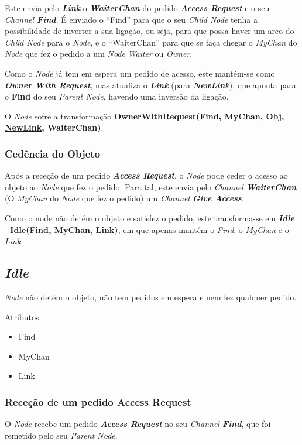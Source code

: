 Este envia pelo \textbf{\emph{Link}} o \textbf{\emph{WaiterChan}} do pedido \emph{\textbf{Access Request}} e o seu \emph{Channel \textbf{Find}}.
É enviado o ``Find'' para que o seu \emph{Child Node} tenha a possibilidade de inverter a sua ligação, ou seja, para que possa haver um arco do \emph{Child Node} para o \emph{Node}, 
e o ``WaiterChan'' para que se faça chegar o \emph{MyChan} do \emph{Node} que fez o pedido a um \emph{Node} \emph{Waiter} ou \emph{Owner}.

Como o \emph{Node} já tem em espera um pedido de acesso, este mantém-se como \emph{\textbf{Owner With Request}},
mas atualiza o \textbf{\emph{Link}} (para \textbf{\emph{NewLink}}),
que aponta para o \textbf{Find} do seu \emph{Parent Node}, havendo uma inversão da ligação.

O \emph{Node} sofre a transformação \textbf{OwnerWithRequest(Find, MyChan, Obj, \underline{NewLink}, WaiterChan)}.


\subsubsection*{Cedência do Objeto}
Após a receção de um pedido \emph{\textbf{Access Request}}, o \emph{Node} pode ceder o acesso ao objeto ao \emph{Node} que fez o pedido.
Para tal, este envia pelo \emph{Channel \textbf{WaiterChan}} (O \emph{MyChan} do \emph{Node} que fez o pedido) um \emph{Channel \textbf{Give Access}}.

Como o node não detém o objeto e satisfez o pedido, este transforma-se em \emph{\textbf{Idle}} - \textbf{Idle(Find, MyChan, Link)}, em que apenas
mantém o \emph{Find}, o \emph{MyChan} e o \emph{Link}.





\subsection{\emph{Idle}}
\label{especificacao:nodes:idle}

\emph{Node} não detém o objeto, não tem pedidos em espera e nem fez qualquer pedido. 

Atributos:
\begin{itemize}
    \item Find
    \item MyChan
    \item Link
\end{itemize}

\subsubsection*{Receção de um pedido Access Request}
O \emph{Node} recebe um pedido \emph{\textbf{Access Request}} no seu \emph{Channel \textbf{Find}}, que foi remetido pelo seu \emph{Parent Node}.

